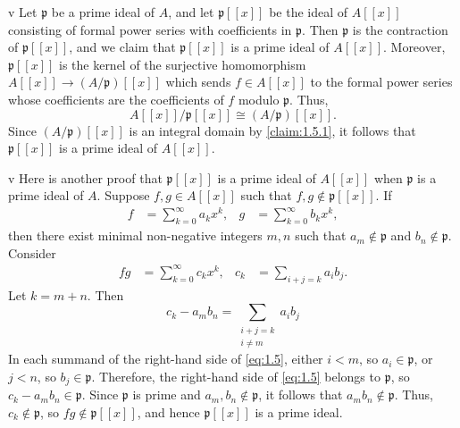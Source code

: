 \begin{partsolution}{1}{5}{v}
Let \(\mathfrak{p}\) be a prime ideal of \(A\), and let \(\mathfrak{p}[[x]]\) be the ideal of \(A[[x]]\) consisting of formal power series with coefficients in \(\mathfrak{p}\).
Then \(\mathfrak{p}\) is the contraction of \(\mathfrak{p}[[x]]\), and we claim that \(\mathfrak{p}[[x]]\) is a prime ideal of \(A[[x]]\).
Moreover, \(\mathfrak{p}[[x]]\) is the kernel of the surjective homomorphism \(A[[x]] \to (A / \mathfrak{p})[[x]]\) which sends \(f \in A[[x]]\) to the formal power series whose coefficients are the coefficients of \(f\) modulo \(\mathfrak{p}\).
Thus,
\begin{equation*}
A[[x]] / \mathfrak{p}[[x]] \cong (A / \mathfrak{p})[[x]].
\end{equation*}
Since \((A / \mathfrak{p})[[x]]\) is an integral domain by \autoref{claim:1.5.1}, it follows that \(\mathfrak{p}[[x]]\) is a prime ideal of \(A[[x]]\).
\end{partsolution}

\begin{altpartsolution}{1}{5}{v}
Here is another proof that \(\mathfrak p[[x]]\) is a prime ideal of \(A[[x]]\) when \(\mathfrak{p}\) is a prime ideal of \(A\).
Suppose \(f, g \in A[[x]]\) such that \(f, g \notin \mathfrak p[[x]]\).
If
\begin{align*}
f &= \sum_{k=0}^\infty a_k x^k, &
g &= \sum_{k=0}^\infty b_k x^k,
\end{align*}
then there exist minimal non-negative integers \(m, n\) such that \(a_m \notin \mathfrak p\) and \(b_n \notin \mathfrak p\).
Consider
\begin{align*}
f g &= \sum_{k=0}^\infty c_k x^k, &
c_k &= \sum_{i + j = k} a_i b_j.
\end{align*}
Let \(k = m + n\).
Then
\begin{equation}
\label{eq:1.5}
c_k - a_m b_n
= \sum_{\substack{i + j = k \\ i \neq m}} a_i b_j
\end{equation}
In each summand of the right-hand side of \eqref{eq:1.5}, either \(i < m\), so \(a_i \in \mathfrak p\), or \(j < n\), so \(b_j \in \mathfrak p\).
Therefore, the right-hand side of \eqref{eq:1.5} belongs to \(\mathfrak{p}\), so \(c_k - a_m b_n \in \mathfrak{p}\).
Since \(\mathfrak{p}\) is prime and \(a_m, b_n \notin \mathfrak{p}\), it follows that \(a_m b_n \notin\mathfrak{p}\).
Thus, \(c_k \notin \mathfrak p\), so \(f g \notin \mathfrak{p}[[x]]\), and hence \(\mathfrak{p}[[x]]\) is a prime ideal.
\end{altpartsolution}